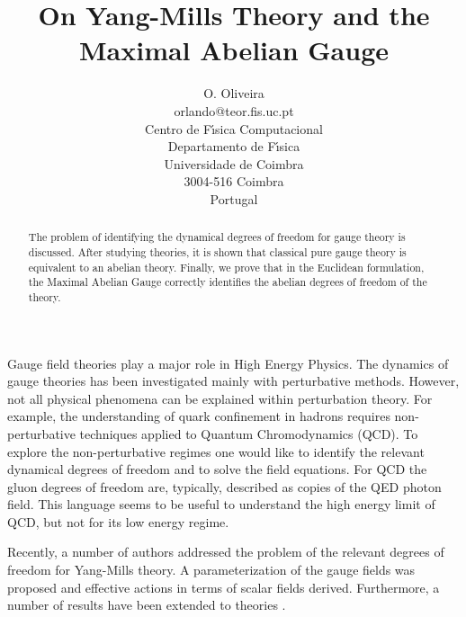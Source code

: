 \documentclass[a4paper,a4paper]{article}
\begin{document}
\title{On \coordHE{} Yang-Mills Theory and the Maximal Abelian Gauge}
\author{O. Oliveira \\
        orlando@teor.fis.uc.pt \\
        Centro de F\'{\i}sica Computacional \\
        Departamento de F\'{\i}sica \\
        Universidade de Coimbra \\
        3004-516 Coimbra \\
        Portugal }

\maketitle

\begin{abstract}
The problem of identifying the dynamical degrees of freedom for \coordHE{}
gauge theory is discussed. After studying \coordHE{} theories, 
it is shown that classical pure \coordHE{} gauge theory is equivalent to an
abelian theory. Finally, we prove that in the Euclidean formulation, the 
Maximal Abelian Gauge correctly identifies the abelian degrees of freedom 
of the \coordHE{} theory.
\end{abstract}



Gauge field theories play a major role in High Energy Physics. The dynamics
of gauge theories has been investigated mainly with perturbative methods. 
However, not all 
physical phenomena can be explained within perturbation theory. 
For example, the understanding of quark confinement in hadrons
requires non-perturbative techniques applied to Quantum Chromodynamics (QCD).
To explore the non-perturbative regimes one would like to 
identify the relevant dynamical degrees of freedom and to solve the field
equations. For QCD the gluon degrees of freedom are, typically, described as
copies of the QED photon field. This language seems to be useful to 
understand the high energy limit of QCD, but not for its
low energy regime.

Recently, a number of authors \cite{FaNi98,Cho99,Sha} addressed the problem 
of the relevant degrees of freedom for \coordHE{} Yang-Mills theory. 
A  parameterization of the gauge fields was proposed and effective actions
in terms of scalar fields derived. Furthermore, a number of 
results have been extended to \coordHE{} theories \cite{FaNi98a,FaNi99,Li99}.
\end{document}
